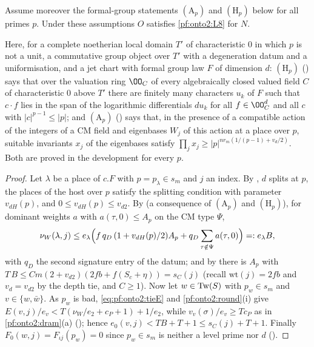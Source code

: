 \begin{proposition}\label{pf:onto2:d2}
Assume moreover the formal-group statements $(\mathrm A_p)$ and $(\mathrm H_p)$ below for all primes $p$. Under these assumptions $O$
satisfies \ref{pf:onto2:L8} for $N$.
\end{proposition}

Here, for a complete noetherian local domain $T'$ of characteristic $0$ in which $p$ is not a unit, a commutative group object over
$T'$ with a degeneration datum and a uniformisation, and a jet chart with formal group law $F$ of dimension $d$:
$(\mathrm H_p)$ () says that over the valuation ring $\OO_C$ of every
algebraically closed valued field $C$ of characteristic $0$ above $T'$ there are finitely many characters $u_k$ of $F$ such that
$c\cdot f$ lies in the span of the logarithmic differentials $du_k$ for all $f\in\OO_C^d$ and all $c$ with $|c|^{p-1}\le|p|$; and
$(\mathrm A_p)$ () says that, in the presence of a compatible action of
the integers of a CM field and eigenbases $W_j$ of this action at a place over $p$, suitable invariants $x_j$ of the eigenbases
satisfy $\prod_jx_j\ge|p|^{n r_m(1/(p-1)+v_d/2)}$. Both are proved in the development for every $p$.

\begin{proof}
Let $\lambda$ be a place of $c.F$ with $p=p_\lambda\in s_m$ and $j$ an index. By
, $d$ splits at $p$, the places of the host over $p$ satisfy the
splitting condition with parameter $v_{dH}(p)$, and $0\le v_{dH}(p)\le v_{d2}$. By 
(a consequence of $(\mathrm A_p)$ and $(\mathrm H_p)$), for dominant weights $a$ with $a(\tau,0)\le A_p$ on the CM type $\Psi$,
\[
\nu_W(\lambda,j)\le e_\lambda\Bigl(f\,q_D\,(1+v_{dH}(p)/2)A_p+q_D\sum_{\tau\notin\Psi}a(\tau,0)\Bigr)=:e_\lambda B ,
\]
with $q_D$ the second signature entry of the datum; and by  there is
$A_p$ with $T\,B\le Cm(2+v_{d2})(2fb+f(S_c+\eta))=s_C(j)$ (recall $\mathrm{wt}(j)=2fb$ and $v_d=v_{d2}$ by the depth tie, and $C\ge1$).
Now let $w\in\mathrm{Tw}(S)$ with $p_w\in s_m$ and $v\in\{w,\bar w\}$. As $p_w$ is bad, \eqref{eq:pf:onto2:tieE} and
\cref{pf:onto2:round}(i) give $E(v,j)/e_v<T(\nu_W/e_2+c_P+1)+1/e_2$, while $v_v(\sigma)/e_v\ge Tc_P$ as in \cref{pf:onto2:dram}(a)
(); hence $e_0(v,j)<TB+T+1\le s_C(j)+T+1$. Finally $F_0(w,j)=F_{\iota j}(p_w)=0$ since
$p_w\in s_m$ is neither a level prime nor $d$ ().
\end{proof}

